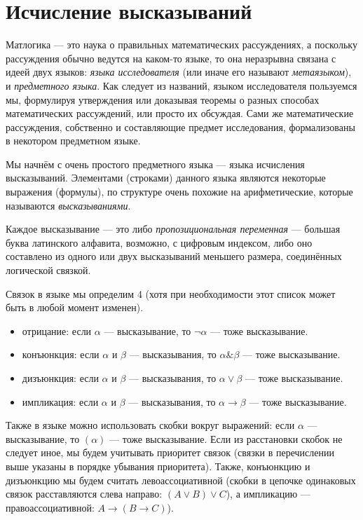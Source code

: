 \section{Исчисление высказываний}

Матлогика --- это наука о правильных математических рассуждениях, а поскольку
рассуждения обычно ведутся на каком-то языке, то она неразрывна связана с идеей
двух языков: \emph{языка исследователя} (или иначе его называют \emph{метаязыком}),
и \emph{предметного языка}. Как следует из названий, языком исследователя 
пользуемся мы, формулируя утверждения или доказывая теоремы о разных способах
математических рассуждений, или просто их обсуждая. Сами же математические рассуждения,
собственно и составляющие предмет исследования, формализованы в некотором предметном 
языке.

Мы начнём с очень простого предметного языка --- языка исчисления высказываний.
Элементами (строками) данного языка являются некоторые выражения (формулы), по структуре
очень похожие на арифметические, которые называются \emph{высказываниями}.

Каждое высказывание --- это либо \emph{пропозициональная переменная} --- 
большая буква латинского алфавита, возможно, с цифровым индексом, либо 
оно составлено из одного или двух высказываний меньшего размера, соединённых логической связкой.

Связок в языке мы определим 4 (хотя при необходимости этот список может быть
в любой момент изменен).
\begin{itemize}
\item отрицание: если $\alpha$ --- высказывание, то $\neg\alpha$ --- тоже высказывание.
\item конъюнкция: если $\alpha$ и $\beta$ --- высказывания, то $\alpha \& \beta$ --- тоже высказывание.
\item дизъюнкция: если $\alpha$ и $\beta$ --- высказывания, то $\alpha \vee \beta$ --- тоже высказывание.
\item импликация: если $\alpha$ и $\beta$ --- высказывания, то $\alpha \rightarrow \beta$ --- тоже высказывание.
\end{itemize}

Также в языке можно использовать скобки вокруг выражений:
если $\alpha$ --- высказывание, то $(\alpha)$ --- тоже высказывание.
Если из расстановки скобок не следует иное, мы будем учитывать приоритет связок
(связки в перечислении выше указаны в порядке убывания приоритета).
Также, конъюнкцию и дизъюнкцию мы будем считать левоассоциативной (скобки в цепочке
одинаковых связок расставляются слева направо: $(A \vee B) \vee C$), 
а импликацию --- правоассоциативной: $A \rightarrow (B \rightarrow C)$). 


